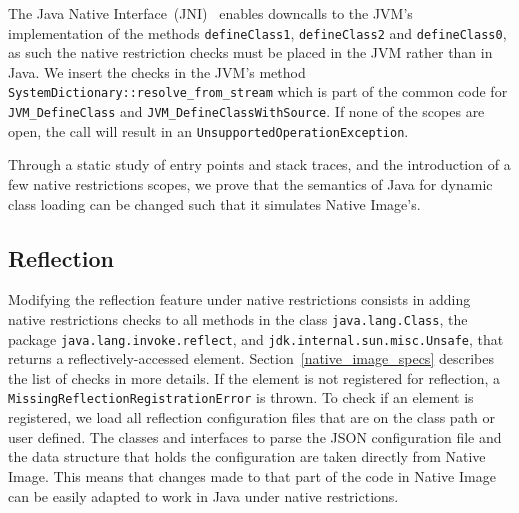The Java Native Interface~(JNI)~\cite{noauthor_jni_nodate} enables downcalls to the JVM's implementation of the methods \verb|defineClass1|, \verb|defineClass2| and \verb|defineClass0|, as such the native restriction checks must be placed in the JVM rather than in Java. We insert the checks in the JVM's method \verb|SystemDictionary::resolve_from_stream| which is part of the common code for \verb|JVM_DefineClass| and \verb|JVM_DefineClassWithSource|. If none of the scopes are open, the call will result in an \verb|UnsupportedOperationException|. 

Through a static study of entry points and stack traces, and the introduction of a few native restrictions scopes, we prove that the semantics of Java for dynamic class loading can be changed such that it simulates Native Image's.

\subsection{Reflection}
Modifying the reflection feature under native restrictions consists in adding native restrictions checks to all methods in the class \verb|java.lang.Class|, the package \verb|java.lang.invoke.reflect|, and \verb|jdk.internal.sun.misc.Unsafe|, that returns a reflectively-accessed element. Section~\ref{native_image_specs} describes the list of checks in more details. 
If the element is not registered for reflection, a \verb|MissingReflectionRegistrationError| is thrown.
To check if an element is registered, we load all reflection configuration files that are on the class path or user defined. The classes and interfaces to parse the JSON configuration file and the data structure that holds the configuration are taken directly from Native Image. This means that changes made to that part of the code in Native Image can be easily adapted to work in Java under native restrictions.

